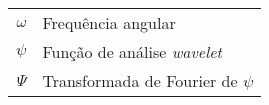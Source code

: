 \begin{tabular}{rl}
  $\omega$ & Frequência angular\\
  $\psi$ & Função de análise \emph{wavelet}\\
  $\Psi$ & Transformada de Fourier de $\psi$\\
\end{tabular}
